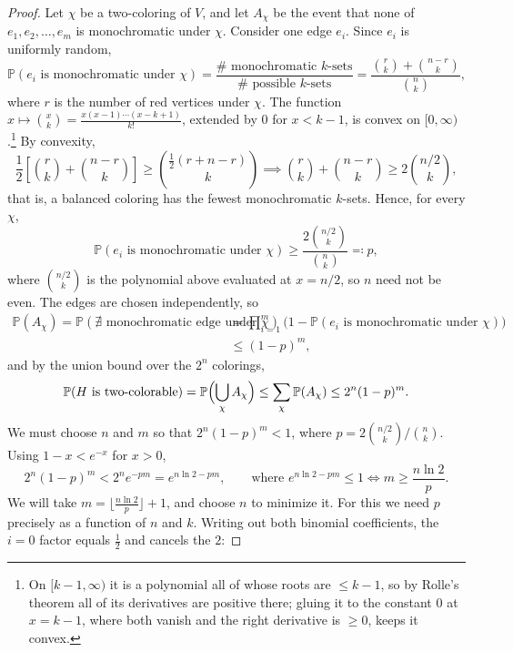 \begin{proof}
    Let \(\chi\) be a two-coloring of \(V\), and let \(A_\chi\) be the event that none of \(e_1, e_2, \ldots, e_m\) is monochromatic under \(\chi\). Consider one edge \(e_i\). Since \(e_i\) is uniformly random,
    \[
        \mathbb{P}(e_i \text{ is monochromatic under } \chi) = \frac{\#\text{ monochromatic } k\text{-sets}}{\#\text{ possible } k\text{-sets}} = \frac{\binom{r}{k} + \binom{n-r}{k}}{\binom{n}{k}},
    \]
    where \(r\) is the number of red vertices under \(\chi\). The function \(x \mapsto \binom{x}{k} = \frac{x(x-1) \cdots (x-k+1)}{k!}\), extended by \(0\) for \(x < k - 1\), is convex on \([0, \infty)\).\footnote{On \([k-1, \infty)\) it is a polynomial all of whose roots are \(\le k - 1\), so by Rolle's theorem all of its derivatives are positive there; gluing it to the constant \(0\) at \(x = k - 1\), where both vanish and the right derivative is \(\ge 0\), keeps it convex.} By convexity,
    \[
        \frac{1}{2} \left[ \binom{r}{k} + \binom{n-r}{k} \right] \ge \binom{\frac{1}{2}(r + n - r)}{k} \implies \binom{r}{k} + \binom{n-r}{k} \ge 2 \binom{n/2}{k},
    \]
    that is, a balanced coloring has the fewest monochromatic \(k\)-sets. Hence, for every \(\chi\),
    \[
        \mathbb{P}(e_i \text{ is monochromatic under } \chi) \ge \frac{2 \binom{n/2}{k}}{\binom{n}{k}} \eqqcolon p,
    \]
    where \(\binom{n/2}{k}\) is the polynomial above evaluated at \(x = n/2\), so \(n\) need not be even. The edges are chosen independently, so
    \begin{align*}
        \mathbb{P}(A_\chi) = \mathbb{P}(\nexists \text{ monochromatic edge under } \chi)
        &= \prod_{i=1}^{m} \bigl( 1 - \mathbb{P}(e_i \text{ is monochromatic under } \chi) \bigr) \\
        &\le (1 - p)^m,
    \end{align*}
    and by the union bound over the \(2^n\) colorings,
    \[
        \mathbb{P}(H \text{ is two-colorable}) = \mathbb{P}\Bigl( \bigcup_{\chi} A_\chi \Bigr) \le \sum_{\chi} \mathbb{P}(A_\chi) \le 2^n (1 - p)^m.
    \]
    We must choose \(n\) and \(m\) so that \(2^n (1 - p)^m < 1\), where \(p = 2\binom{n/2}{k} / \binom{n}{k}\). Using \(1 - x < e^{-x}\) for \(x > 0\),
    \[
        2^n (1 - p)^m < 2^n e^{-pm} = e^{n \ln 2 - pm}, \qquad \text{where } e^{n \ln 2 - pm} \le 1 \iff m \ge \frac{n \ln 2}{p}.
    \]
    We will take \(m = \bigl\lfloor \frac{n \ln 2}{p} \bigr\rfloor + 1\), and choose \(n\) to minimize it. For this we need \(p\) precisely as a function of \(n\) and \(k\). Writing out both binomial coefficients, the \(i = 0\) factor equals \(\frac{1}{2}\) and cancels the \(2\):

\end{proof}
